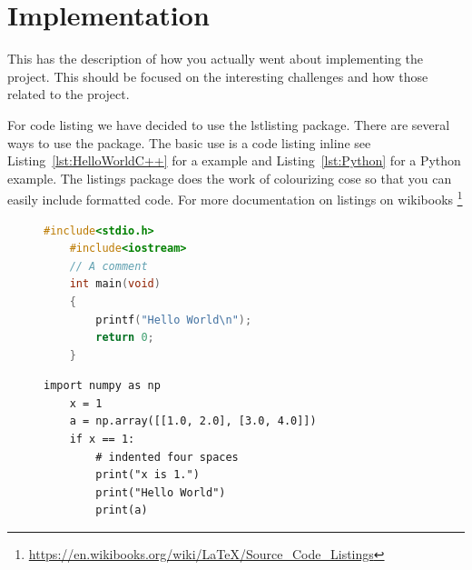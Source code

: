 \chapter{Implementation}
\label{chap:implementation}
This has the description of how you actually went about implementing the project.  This should be focused on the interesting challenges and how those related to the project.



For code listing we have decided to use the lstlisting package. There are several ways to use the package.  The basic use is a code listing inline see Listing~\ref{lst:HelloWorldC++} for a \CPP example and Listing~\ref{lst:Python} for a Python example. The listings package does the work of colourizing cose so that you can easily include formatted code.   For more documentation on listings on wikibooks \footnote{\url{https://en.wikibooks.org/wiki/LaTeX/Source_Code_Listings}}

\lstset{frameround=tttt}
\lstset{frame=single}
\lstset{xleftmargin=.05\textwidth, xrightmargin=.05\textwidth}



\begin{figure} %
\begin{lstlisting}[language=C++, caption= {Hello World C++ The code listing for Hello World in C++, with colour syntax highlighting.}, label={lst:HelloWorldC++}]
    #include<stdio.h>
    #include<iostream>
    // A comment
    int main(void)
    {
        printf("Hello World\n");
        return 0;
    }
\end{lstlisting}
\end{figure}

\begin{figure}
\lstset{language=Python}
\begin{lstlisting}[caption = {The code listing for a Python increment a matrix example}, label={lst:Python}]
    import numpy as np
    x = 1
    a = np.array([[1.0, 2.0], [3.0, 4.0]])
    if x == 1:
        # indented four spaces
        print("x is 1.")
        print("Hello World")
        print(a)
\end{lstlisting}
\end{figure}


